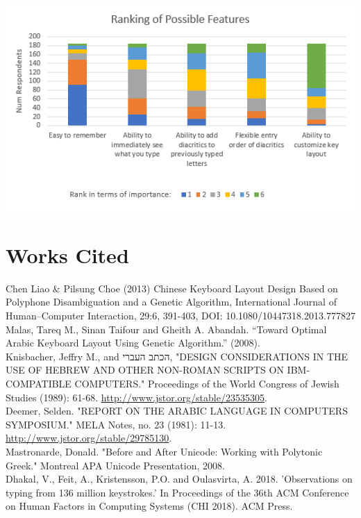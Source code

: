 \documentclass[11pt]{article}
\begin{document}
\begin{center}
\includegraphics[width=.9\linewidth]{./images/ranking-of-possible-features.PNG}
\end{center}


\section{Works Cited}
\label{sec:orgcfe4ead}

Chen Liao \& Pilsung Choe (2013) Chinese Keyboard Layout Design Based on Polyphone Disambiguation and a Genetic Algorithm, International Journal of Human–Computer Interaction, 29:6, 391-403, DOI: 10.1080/10447318.2013.777827 \\

Malas, Tareq M., Sinan Taifour and Gheith A. Abandah. “Toward Optimal Arabic Keyboard Layout Using Genetic Algorithm.” (2008). \\

Knisbacher, Jeffry M., and \texthebrew{הכתב העברי}, "DESIGN CONSIDERATIONS IN THE USE OF HEBREW AND OTHER NON-ROMAN SCRIPTS ON IBM-COMPATIBLE COMPUTERS." Proceedings of the World Congress of Jewish Studies (1989): 61-68. \url{http://www.jstor.org/stable/23535305}. \\

Deemer, Selden. "REPORT ON THE ARABIC LANGUAGE IN COMPUTERS SYMPOSIUM." MELA Notes, no. 23 (1981): 11-13. \url{http://www.jstor.org/stable/29785130}. \\

Mastronarde, Donald. "Before and After Unicode: Working with Polytonic Greek." Montreal APA Unicode Presentation, 2008. \\

Dhakal, V., Feit, A., Kristensson, P.O. and Oulasvirta, A. 2018. 'Observations on typing from 136 million keystrokes.' In Proceedings of the 36th ACM Conference on Human Factors in Computing Systems (CHI 2018). ACM Press. \\
\end{document}
